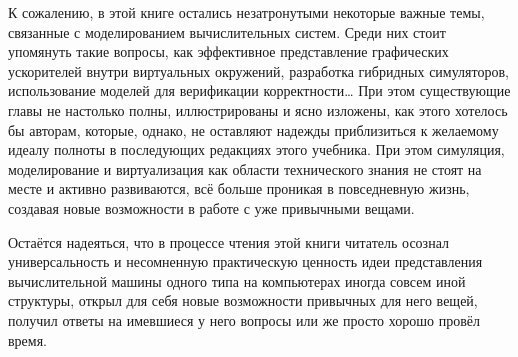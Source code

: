 К сожалению, в этой книге остались незатронутыми некоторые важные темы, связанные с моделированием вычислительных систем. Среди них стоит упомянуть такие вопросы, как эффективное представление графических ускорителей внутри виртуальных окружений, разработка гибридных симуляторов, использование моделей для верификации корректности\dots{}
При этом существующие главы не настолько полны, иллюстрированы и ясно изложены, как этого хотелось бы авторам, которые, однако, не оставляют надежды приблизиться к желаемому идеалу полноты в последующих редакциях этого учебника. При этом симуляция, моделирование и виртуализация как области технического знания не стоят на месте и активно развиваются, всё больше проникая в повседневную жизнь, создавая новые возможности в работе с уже привычными вещами. %

Остаётся надеяться, что в процессе чтения этой книги читатель осознал универсальность и несомненную практическую ценность идеи представления вычислительной машины одного типа на компьютерах иногда совсем иной структуры, открыл для себя новые возможности привычных для него вещей, получил ответы на имевшиеся у него вопросы или же просто хорошо провёл время.
